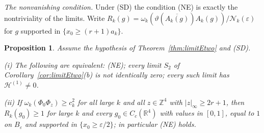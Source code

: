 \documentclass[aps,prd,twocolumn,superscriptaddress,nofootinbib,longbibliography,floatfix,amsmath,amssymb,10pt]{revtex4-2}
\newtheorem{proposition}[theorem]{Proposition}
\theoremstyle{definition}
\theoremstyle{remark}
\newcommand{\R}{\mathbb{R}}
\newcommand{\Z}{\mathbb{Z}}
\begin{document}
\emph{The nonvanishing condition.} Under (SD) the condition (NE) is
exactly the nontriviality of the limits. Write $R_k(g)=\omega_k(\vartheta(\overline{
A_k(g)})A_k(g))/\mathcal N_k(\varepsilon)$ for $g$ supported in
$\{x_0\ge(r+1)a_k\}$.

\begin{proposition}\label{prop:limitEne}
Assume the hypothesis of Theorem~\textup{\ref{thm:limitEtwo}} and
\textup{(SD)}.

\textup{(i)} The following are equivalent: \textup{(NE)}; every limit $S_2$
of Corollary~\textup{\ref{cor:limitEtwo}(b)} is not identically zero; every
such limit has $\mathcal H^{(1)}\ne0$.

\textup{(ii)} If $\omega_k(\Phi_0\Phi_z)\ge c_k^2$ for all large $k$ and all
$z\in\Z^4$ with $|z|_\infty\ge2r+1$, then $R_k(g_0)\ge1$ for large $k$ and
every $g_0\in C_c(\R^4)$ with values in $[0,1]$, equal to $1$ on
$B_\varepsilon$ and supported in $\{x_0\ge\varepsilon/2\}$; in particular
\textup{(NE)} holds.
\end{proposition}
\end{document}
